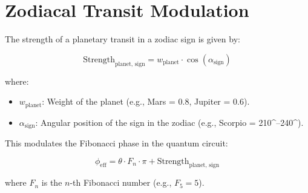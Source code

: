\documentclass{article}
\begin{document}
\section{Zodiacal Transit Modulation}

The strength of a planetary transit in a zodiac sign is given by:

\[
\text{Strength}_{\text{planet, sign}} = w_{\text{planet}} \cdot \cos(\alpha_{\text{sign}})
\]

where:
\begin{itemize}
    \item \(w_{\text{planet}}\): Weight of the planet (e.g., Mars = 0.8, Jupiter = 0.6).
    \item \(\alpha_{\text{sign}}\): Angular position of the sign in the zodiac (e.g., Scorpio = 210^\circ--240^\circ).
\end{itemize}

This modulates the Fibonacci phase in the quantum circuit:

\[
\phi_{\text{eff}} = \theta \cdot F_n \cdot \pi + \text{Strength}_{\text{planet, sign}}
\]

where \(F_n\) is the \(n\)-th Fibonacci number (e.g., \(F_5 = 5\)).
\end{document}
